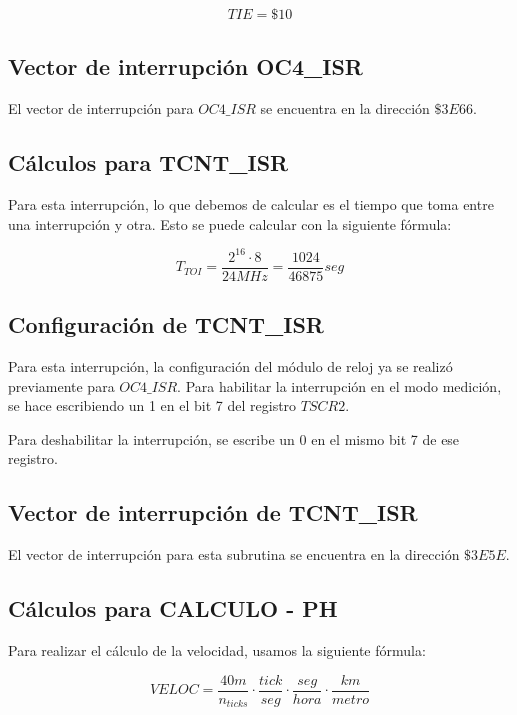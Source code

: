 \documentclass[12pt,letterpaper]{report} %
\begin{document}
\begin{align*}
    TIE = \$10
\end{align*}

\subsection{Vector de interrupción OC4\_ISR}

El vector de interrupción para $OC4\_ISR$ se encuentra en la dirección $\$3E66$.

\subsection{Cálculos para TCNT\_ISR}
Para esta interrupción, lo que debemos de calcular es el tiempo que toma entre una interrupción y otra. Esto se puede calcular con la siguiente fórmula:

\begin{equation}
    T_{TOI} = \frac{2^{16} \cdot 8}{24MHz} = \frac{1024}{46875} seg
\end{equation}

\subsection{Configuración de TCNT\_ISR}

Para esta interrupción, la configuración del módulo de reloj ya se realizó previamente para $OC4\_ISR$. Para habilitar la interrupción en el modo medición, se hace escribiendo un 1 en el bit 7 del registro $TSCR2$. 

Para deshabilitar la interrupción, se escribe un 0 en el mismo bit 7 de ese registro.

\subsection{Vector de interrupción de TCNT\_ISR}

El vector de interrupción para esta subrutina se encuentra en la dirección $\$3E5E$.


\subsection{Cálculos para CALCULO - PH}

Para realizar el cálculo de la velocidad, usamos la siguiente fórmula:

\begin{equation}
    VELOC = \frac{40m}{n_{ticks}} \cdot \frac{tick}{seg} \cdot \frac{seg}{hora} \cdot \frac{km}{metro} 
\end{equation}
\end{document}
